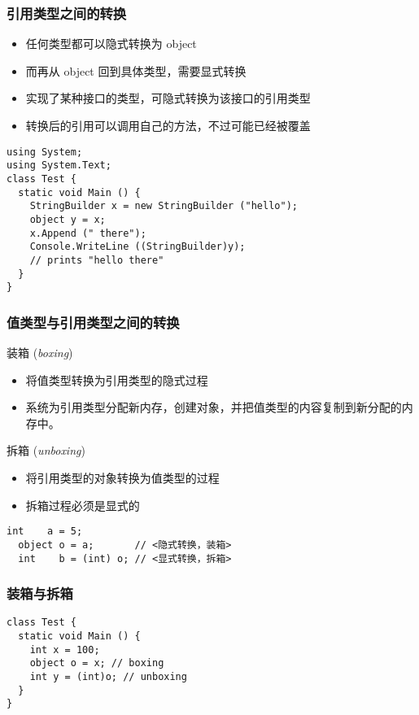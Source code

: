 \begin{frame}[fragile]
\frametitle{引用类型之间的转换}
\begin{itemize}
\item 任何类型都可以隐式转换为 object
\item 而再从 object 回到具体类型，需要显式转换
\item 实现了某种接口的类型，可隐式转换为该接口的引用类型
\item 转换后的引用可以调用自己的方法，不过可能已经被覆盖
\end{itemize}
\pause
\begin{lstlisting}
using System;
using System.Text;
class Test {
  static void Main () {
    StringBuilder x = new StringBuilder ("hello");
    object y = x;
    x.Append (" there");
    Console.WriteLine ((StringBuilder)y);
    // prints "hello there"
  }
}
\end{lstlisting}
\end{frame}

\begin{frame}[fragile]
\frametitle{值类型与引用类型之间的转换}
\begin{block}{装箱 (\textit{boxing})}
  \begin{itemize}
  \item 将值类型转换为引用类型的隐式过程
  \item 系统为引用类型分配新内存，创建对象，并把值类型的内容复制到新分配的内存中。
  \end{itemize}
\end{block}
\pause
\begin{block}{拆箱 (\textit{unboxing})}
  \begin{itemize}
  \item 将引用类型的对象转换为值类型的过程
  \item 拆箱过程必须是显式的
  \end{itemize}
\end{block}
\pause
\begin{lstlisting}[escapeinside=<>]
  int    a = 5;
  object o = a;       // <隐式转换，装箱>
  int    b = (int) o; // <显式转换，拆箱>

\end{lstlisting}
\end{frame}

\begin{frame}[fragile]
\frametitle{装箱与拆箱}

\begin{lstlisting}
class Test {
  static void Main () {
    int x = 100;
    object o = x; // boxing
    int y = (int)o; // unboxing
  }
}

\end{lstlisting}
  \begin{figure}[htbp]
    \centering
    
  \end{figure}

\end{frame}

